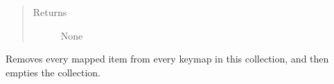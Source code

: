 \documentclass[letterpaper,10pt,english,openany,oneside]{sphinxmanual}
\begin{document}
\begin{fulllineitems}
\begin{fulllineitems}
\begin{quote}
\begin{description}
\begin{itemize}
\end{itemize}

\item[{Returns}] \leavevmode
None

\end{description}\end{quote}

\end{fulllineitems}


\begin{fulllineitems}
\label{\detokenize{io_anim_mvnx:io_anim_mvnx.utils.KeymapManager.unregister}}
Removes every mapped item from every keymap in this collection, and
then empties the collection.

\end{fulllineitems}


\end{fulllineitems}

\end{document}
